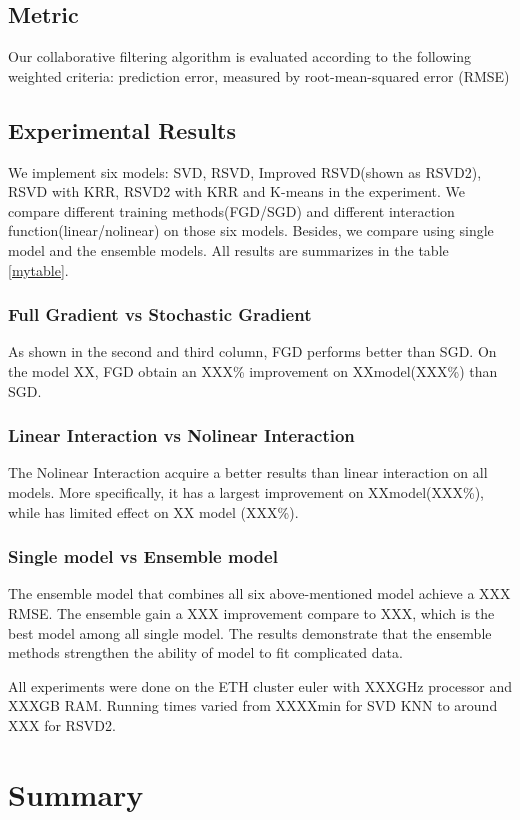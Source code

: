 \documentclass[10pt,conference,compsocconf]{IEEEtran}
\begin{document}
\subsection{Metric}
Our collaborative filtering algorithm is evaluated according to the following weighted criteria:
prediction error, measured by root-mean-squared error (RMSE)

\subsection{Experimental Results}
We implement six models: SVD, RSVD, Improved RSVD(shown as RSVD2), RSVD with KRR, RSVD2 with KRR and K-means in the experiment. We compare different training methods(FGD/SGD) and different interaction
function(linear/nolinear) on those six models. Besides, we compare using single model and the ensemble models. All results are summarizes in the table \ref{mytable}.

\subsubsection{Full Gradient vs Stochastic Gradient}
As shown in the second and third column, FGD performs better than SGD. On the model XX, FGD obtain an XXX\% improvement on XXmodel(XXX\%) than SGD. 

\subsubsection{Linear Interaction vs Nolinear Interaction}
The Nolinear Interaction acquire a better results than linear interaction on all models. More specifically, it has a largest improvement on XXmodel(XXX\%), while has limited effect on XX model (XXX\%).

\subsubsection{Single model vs Ensemble model}
The ensemble model that combines all six above-mentioned model achieve a XXX RMSE. The ensemble gain a XXX improvement compare to XXX, which is the best model among all single model. The results demonstrate that the ensemble methods strengthen the ability of model to fit complicated data.


All experiments were done on the ETH cluster euler with XXXGHz processor and XXXGB RAM. Running times varied from XXXXmin for SVD KNN to around XXX for RSVD2.

\section{Summary}
\end{document}
